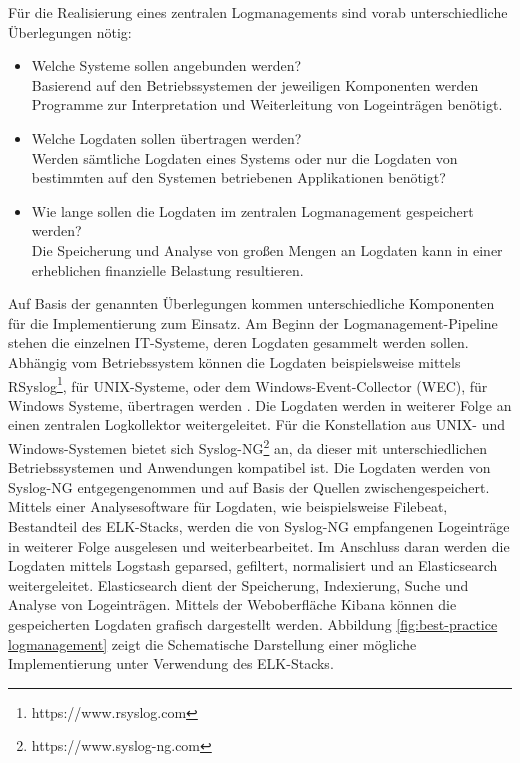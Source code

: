 Für die Realisierung eines zentralen Logmanagements sind vorab unterschiedliche Überlegungen nötig: 
\begin{itemize}
    \item Welche Systeme sollen angebunden werden?\\
    Basierend auf den Betriebssystemen der jeweiligen Komponenten werden Programme zur Interpretation und Weiterleitung von Logeinträgen benötigt. 
    \item Welche Logdaten sollen übertragen werden?\\
    Werden sämtliche Logdaten eines Systems oder nur die Logdaten von bestimmten auf den Systemen betriebenen Applikationen benötigt?
    \item Wie lange sollen die Logdaten im zentralen Logmanagement gespeichert werden?\\
    Die Speicherung und Analyse von großen Mengen an Logdaten kann in einer erheblichen finanzielle Belastung resultieren.
\end{itemize}
\bigbreak
Auf Basis der genannten Überlegungen kommen unterschiedliche Komponenten für die Implementierung zum Einsatz. Am Beginn der Logmanagement-Pipeline stehen die einzelnen IT-Systeme, deren Logdaten gesammelt werden sollen. Abhängig vom Betriebssystem können die Logdaten beispielsweise mittels RSyslog\footnote{https://www.rsyslog.com}, für UNIX-Systeme, oder dem \glqq{}Windows-Event-Collector\grqq{} (WEC), für Windows Systeme, übertragen werden \autocite{WEC}. Die Logdaten werden in weiterer Folge an einen zentralen Logkollektor weitergeleitet. Für die Konstellation aus UNIX- und Windows-Systemen bietet sich Syslog-NG\footnote{https://www.syslog-ng.com} an, da dieser mit unterschiedlichen Betriebssystemen und Anwendungen kompatibel ist. Die Logdaten werden von Syslog-NG entgegengenommen und auf Basis der Quellen zwischengespeichert. Mittels einer Analysesoftware für Logdaten, wie beispielsweise \glqq{}Filebeat\grqq{}, Bestandteil des ELK-Stacks, werden die von Syslog-NG empfangenen Logeinträge in weiterer Folge ausgelesen und weiterbearbeitet. Im Anschluss daran werden die Logdaten mittels Logstash geparsed, gefiltert, normalisiert und an Elasticsearch weitergeleitet. Elasticsearch dient der Speicherung, Indexierung, Suche und Analyse von Logeinträgen. Mittels der Weboberfläche Kibana können die gespeicherten Logdaten grafisch dargestellt werden. Abbildung \ref{fig:best-practice logmanagement} zeigt die Schematische Darstellung einer mögliche Implementierung unter Verwendung des ELK-Stacks. 


